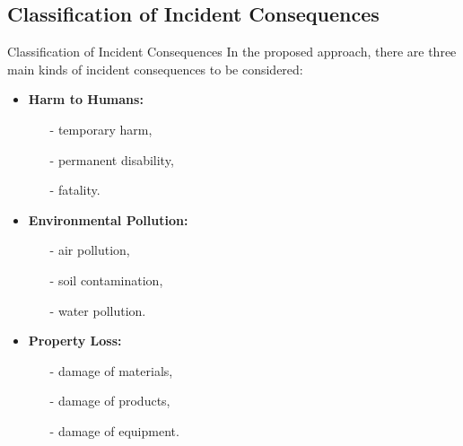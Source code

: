 \subsection{Classification of Incident Consequences}
\begin{frame}{Classification of Incident Consequences}
    \label{Dynamic Risk Assessment: Classification of Incident Consequences}
    In the proposed approach, there are three main kinds of incident consequences to be considered:
    \begin{itemize}
      \item \textbf{Harm to Humans:}\\[-5pt]
      \begin{itemize}
        \item[-] temporary harm,
        \item[-] permanent disability,
        \item[-] fatality.
      \end{itemize}
      \item \textbf{Environmental Pollution:}\\[-5pt]
      \begin{itemize}
        \item[-] air pollution,
        \item[-] soil contamination,
        \item[-] water pollution.
      \end{itemize}
      \item \textbf{Property Loss:}\\[-5pt]
      \begin{itemize}
        \item[-] damage of materials,
        \item[-] damage of products,
        \item[-] damage of equipment.
      \end{itemize}
    \end{itemize}
\end{frame}

